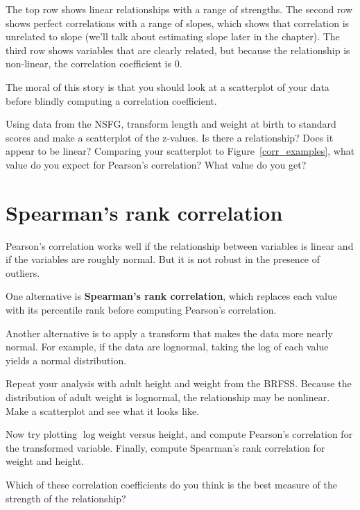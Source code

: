 \documentclass[12pt]{book}
\begin{document}
The top row shows linear relationships with a range
of strengths.  The second row shows perfect correlations with a range
of slopes, which shows that correlation is unrelated to slope
(we'll talk about estimating slope later in the chapter).  The third
row shows variables that are clearly related, but because the relationship
is non-linear, the correlation coefficient is 0.

The moral of this story is that you should look at a scatterplot of
your data before blindly computing a correlation coefficient.

\begin{ex}

Using data from the NSFG, transform length and weight at birth to
standard scores and make a scatterplot of the z-values.  Is there
a relationship?  Does it appear to be linear?  Comparing your scatterplot
to Figure~\ref{corr_examples}, what value do you expect for Pearson's
correlation?  What value do you get?

\end{ex}


\section{Spearman's rank correlation}

Pearson's correlation works well if the relationship between variables
is linear and if the variables are roughly normal.  But it is not
robust in the presence of outliers.

One alternative is {\bf Spearman's rank correlation}, which replaces
each value with its percentile rank before computing Pearson's
correlation.

Another alternative is to apply a transform that makes the data more
nearly normal.  For example, if the data are lognormal, taking the log
of each value yields a normal distribution.

\begin{ex}

Repeat your analysis with adult height and weight from the BRFSS.
Because the distribution of adult weight is lognormal, the relationship
may be nonlinear.  Make a scatterplot and see what it looks like.

Now try plotting $\log \mathrm{weight}$ versus height, and compute
Pearson's correlation for the transformed variable.
Finally, compute Spearman's rank correlation for weight and height.

Which of these correlation coefficients do you think is the best
measure of the strength of the relationship?

\end{ex}
\end{document}
